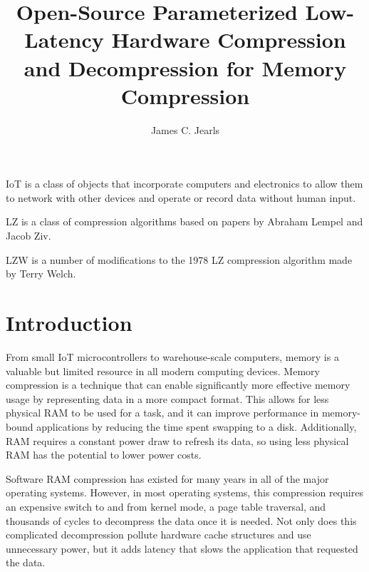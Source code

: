 \documentclass[doublespace,draft,nopageskip]{VTthesis} %
\title{Open-Source Parameterized Low-Latency Hardware Compression and Decompression for Memory Compression}
\author{James C. Jearls}
\begin{document}
  \frontmatter
  \maketitle
  \tableofcontents

	\listoffigures
	\listoftables
    \printnomenclature %


IoT is a class of objects that incorporate computers and electronics to allow them to network with other devices and operate or record data without human input.


LZ is a class of compression algorithms based on papers by Abraham Lempel and Jacob Ziv.
 
 
LZW is a number of modifications to the 1978 LZ compression algorithm made by Terry Welch.
 

\mainmatter

\chapter{Introduction} \label{ch:introduction}
From small IoT microcontrollers to warehouse-scale computers, memory is a valuable but limited resource in all modern computing devices. Memory compression is a technique that can enable significantly more effective memory usage by representing data in a more compact format. This allows for less physical RAM to be used for a task, and it can improve performance in memory-bound applications by reducing the time spent swapping to a disk. Additionally, RAM requires a constant power draw to refresh its data, so using less physical RAM has the potential to lower power costs.

Software RAM compression has existed for many years in all of the major operating systems. However, in most operating systems, this compression requires an expensive switch to and from kernel mode, a page table traversal, and thousands of cycles to decompress the data once it is needed. Not only does this complicated decompression pollute hardware cache structures and use unnecessary power, but it adds latency that slows the application that requested the data.
\end{document}
